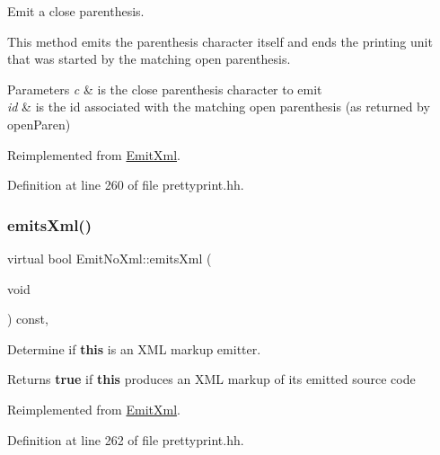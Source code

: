 Emit a close parenthesis. 

This method emits the parenthesis character itself and ends the printing unit that was started by the matching open parenthesis. 
\begin{DoxyParams}{Parameters}
{\em c} & is the close parenthesis character to emit \\
\hline
{\em id} & is the id associated with the matching open parenthesis (as returned by open\+Paren) \\
\hline
\end{DoxyParams}


Reimplemented from \mbox{\hyperlink{class_emit_xml_a3442a3f23a65cfcf073d57cf64733493}{Emit\+Xml}}.



Definition at line 260 of file prettyprint.\+hh.

\mbox{\label{class_emit_no_xml_a9344bd2b72587387d09737738b5fe05f}} 
\subsubsection{\texorpdfstring{emitsXml()}{emitsXml()}}
{\footnotesize\ttfamily virtual bool Emit\+No\+Xml\+::emits\+Xml (\begin{DoxyParamCaption}\item[{void}]{ }\end{DoxyParamCaption}) const\hspace{0.3cm}{\ttfamily [inline]}, {\ttfamily [virtual]}}



Determine if {\bfseries{this}} is an X\+ML markup emitter. 

\begin{DoxyReturn}{Returns}
{\bfseries{true}} if {\bfseries{this}} produces an X\+ML markup of its emitted source code 
\end{DoxyReturn}


Reimplemented from \mbox{\hyperlink{class_emit_xml_ad73a5d828fc7cd70f1e9ec1e6afad1fa}{Emit\+Xml}}.



Definition at line 262 of file prettyprint.\+hh.

\mbox{\label{class_emit_no_xml_ad9520b535d33c3501331078dbb97351b}} 
